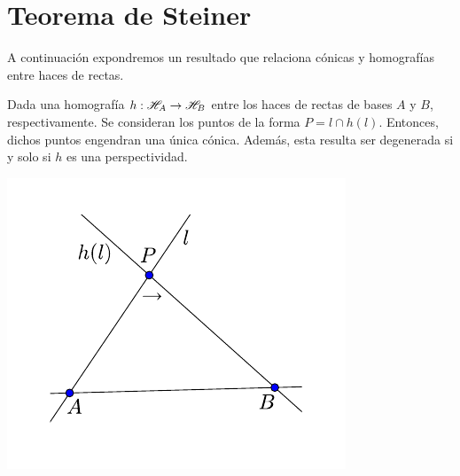 \section{Teorema de Steiner}
A continuación expondremos un resultado que relaciona cónicas y homografías entre haces de rectas.
\begin{theo}
	\label{C8_teo_steiner}
	Dada una homografía $h:\mathscr{H}_A\rightarrow \mathscr{H}_B$ entre los haces de rectas de bases $A$ y $B$, respectivamente. Se consideran los puntos de la forma $P=l\cap h(l)$. Entonces, dichos puntos engendran una única cónica. Además, esta resulta ser degenerada si y solo si $h$ es una perspectividad.
	\begin{center}
		\includegraphics[scale=.8]{Graficos/Conicas/TeoremaSteiner}
	\end{center}
\end{theo}

